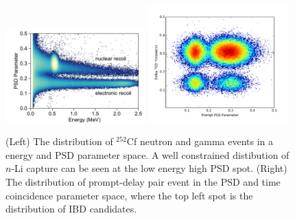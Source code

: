     	\begin{figure}[h]
    \centering
    \includegraphics[width=0.48\textwidth]{Figures/PSDvE.pdf}
    \includegraphics[width=0.48\textwidth]{Figures/PSDvT.pdf}
    \caption[Event selection based on PSD]{
    	(Left) The distribution of $^{252}$Cf neutron and gamma events in a energy and PSD parameter space.
    	A well constrained distibution of $n$-Li capture can be seen at the low energy high PSD spot.
    	(Right) The distribution of prompt-delay pair event in the PSD and time coincidence parameter space, where the top left spot is the distribution of IBD candidates.
	}
    \label{fig:PSDvEvT}
	\end{figure}
	
